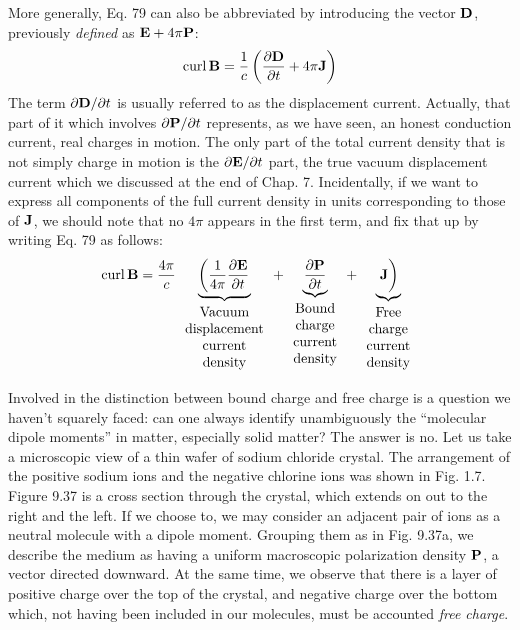 More generally, Eq. 79 can also be abbreviated by introducing the
vector $\mathbf{D}$, previously \emph{defined} as $\mathbf{E} + 4\pi\mathbf{P}$:
\begin{equation}
  \operatorname{curl}\mathbf{B} = \frac{1}{c} \left(\frac{\partial\mathbf{D}}{\partial t} + 4\pi\mathbf{J}\right)
\end{equation}
The term $\partial\mathbf{D}/\partial t$ is usually referred to as 
the displacement current.
Actually, that part of it which involves $\partial\mathbf{P}/\partial t$ represents, as we have
seen, an honest conduction current, real charges in motion. The
only part of the total current density that is not simply charge in
motion is the $\partial\mathbf{E}/\partial t$ part, the true vacuum displacement current
which we discussed at the end of Chap. 7. Incidentally, if we want
to express all components of the full current density in units corresponding
to those of $\mathbf{J}$, we should note that no $4\pi$ appears in the first
term, and fix that up by writing Eq. 79 as follows:
\begin{equation}
  \curl\vc{B} = \frac{4\pi}{c} 
      \underbrace{\left(\frac{1}{4\pi}\frac{\partial\vc{E}}{\partial t}\right.}_{
        \begin{array}{c}\text{Vacuum}\\\text{displacement}\\\text{current}\\\text{density}\end{array}
      }
    + \underbrace{\frac{\partial\vc{P}}{\partial t}}_{
        \begin{array}{c}\text{Bound}\\\text{charge}\\\text{current}\\\text{density}\end{array}
      }
    + \underbrace{\left.\vc{J}\mycruftystrut\right)}_{
        \begin{array}{c}\text{Free}\\\text{charge}\\\text{current}\\\text{density}\end{array}
      }
\end{equation}

Involved in the distinction between bound charge and free charge
is a question we haven't squarely faced: can one always identify
unambiguously the ``molecular dipole moments'' in matter, especially
solid matter? The answer is no. Let us take a microscopic view of
a thin wafer of sodium chloride crystal. The arrangement of the
positive sodium ions and the negative chlorine ions was shown in
Fig. 1.7. Figure 9.37 is a cross section through the crystal, which
extends on out to the right and the left. If we choose to, we may
consider an adjacent pair of ions as a neutral molecule with a dipole
moment. Grouping them as in Fig. 9.37a, we describe the medium
as having a uniform macroscopic polarization density $\mathbf{P}$, a vector
directed downward. At the same time, we observe that there is a
layer of positive charge over the top of the crystal, and negative
charge over the bottom which, not having been included in our 
molecules, must be accounted \emph{free charge}.

